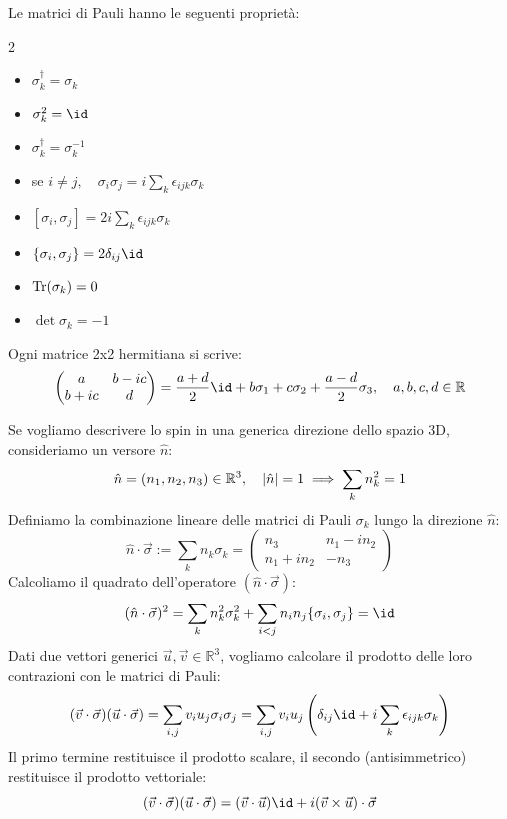 Le matrici di Pauli hanno le seguenti proprietà:
\begin{multicols}{2}
\begin{itemize}
    \item \(\sigma_k^\dagger = \sigma_k\)
    \item \(\sigma_k^2= \id\)
    \item \(\sigma_k^\dagger = \sigma_k^{-1}\)
    \item se \(i \neq j, \quad \sigma_i\sigma_j=i \sum_{k}\epsilon_{ijk}\sigma_k\)
    \item \(\left[ \sigma_i, \sigma_j \right]=2i\sum_k\epsilon_{ijk}\sigma_k\)
    \item \(\left\{ \sigma_i,\sigma_j \right\}= 2\delta_{ij}\id\)
    \item \(\Tr(\sigma_k)=0\)
    \item \(\det\sigma_k= -1\)
\end{itemize}    
\end{multicols}

Ogni matrice 2x2 hermitiana si scrive:
\[
    \begin{pmatrix}
        a & b-ic \\
        b+ic & d
    \end{pmatrix}
    = \frac{a+d}{2} \id + b \sigma_1 + c \sigma_2 + \frac{a-d}{2} \sigma_3, \quad a,b,c,d \in \mathbb{R}
\]


Se vogliamo descrivere lo spin in una generica direzione dello spazio 3D, consideriamo un versore $\hat{n}$:
\[
\hat{n} = (n_1, n_2, n_3) \in \mathbb{R}^3, \quad \abs{\hat{n}}=1 \implies \sum_k n_k^2 = 1
\]
Definiamo la combinazione lineare delle matrici di Pauli $\sigma_k$ lungo la direzione $\hat{n}$:
\begin{equation}
    \hat{n} \cdot \vec{\sigma} := \sum_k n_k \sigma_k =
    \begin{pmatrix}
    n_3 & n_1 - i n_2 \\
    n_1 + i n_2 & -n_3
    \end{pmatrix}
\end{equation}
Calcoliamo il quadrato dell'operatore $(\hat{n} \cdot \vec{\sigma})$:
\[
(\hat{n} \cdot \vec{\sigma})^2 = \sum_{k} n_k^2 \sigma_k^2+ \sum_{i < j} n_i n_j \{\sigma_i, \sigma_j\}=\id
\]
Dati due vettori generici $\vec{u}, \vec{v} \in \mathbb{R}^3$, vogliamo calcolare il prodotto delle loro contrazioni con le matrici di Pauli:
\[
(\vec{v} \cdot \vec{\sigma})(\vec{u} \cdot \vec{\sigma}) = \sum_{i,j} v_i u_j \sigma_i \sigma_j = \sum_{i,j} v_i u_j \left(\delta_{ij}\id + i \sum_k \epsilon_{ijk}\sigma_k\right)
\]
Il primo termine restituisce il prodotto scalare, il secondo (antisimmetrico) restituisce il prodotto vettoriale:
\begin{equation}
(\vec{v} \cdot \vec{\sigma})(\vec{u} \cdot \vec{\sigma}) = (\vec{v} \cdot \vec{u}) \id + i (\vec{v} \times \vec{u}) \cdot \vec{\sigma}
\end{equation}


